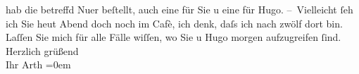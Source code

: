 \begin{ledgroupsized}[t]{13cm}
               hab die betreffd Nu{\geminationm}er beſtellt, auch eine für Sie u
               eine für Hugo.\pend
           \pstart
           {\pb}– Vielleicht ſeh ich Sie heut Abend doch noch im
               Cafè, ich denk, daſs ich nach zwölf dort bin. Laſſen Sie mich für alle
               Fälle wiſſen, wo Sie u Hugo morgen {\pb}aufzugreifen ſind.\pend
           \pstart
           Herzlich grüßend{\\[\baselineskip]}Ihr \spacefill\mbox{Arth}\pend
           \leftskip=0em{}
         
         \endnumbering{}\end{ledgroupsized}  \newcommand{\dateiname}{L00414}\newcommand{\titel}{Arthur Schnitzler an Richard Beer-Hofmann, [28.  3. 1895?]}\newcommand{\editorInnen}{Martin Anton Müller und Gerd-Hermann Susen}
      